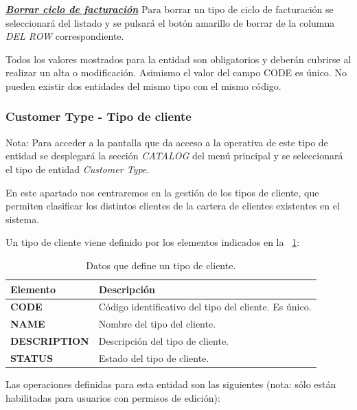 \underline{\textsl{\textbf{Borrar ciclo de facturación}}}\newline
Para borrar un tipo de ciclo de facturación se seleccionará del listado y se pulsará el botón amarillo de borrar de la columna \textit{DEL ROW} correspondiente.\newline

Todos los valores mostrados para la entidad son obligatorios y deberán cubrirse al realizar un alta o modificación. Asimismo el valor del campo CODE es único. No pueden existir dos entidades del mismo tipo con el mismo código.



\subsubsection{Customer Type - Tipo de cliente}
\label{sub:customer-type}

Nota: Para acceder a la pantalla que da acceso a la operativa de este tipo de entidad se desplegará la sección \emph{CATALOG} del menú principal y se seleccionará el tipo de entidad \emph{Customer Type}.

En este apartado nos centraremos en la gestión de los tipos de cliente, que permiten clasificar los distintos clientes de la cartera de clientes existentes en el sistema.


Un tipo de cliente viene definido por los elementos indicados en la \tablename~\ref{tab:tipo-cliente}:



\begin{table}[H]
  \centering
  \setlength{\leftmargini}{0.4cm}
  \resizebox{14cm}{!} {
  \begin{tabular}{|m{3cm} m{11cm}|}
  \rowcolor{udcpink!25}
  \hline
  	\textbf{Elemento} & \textbf{Descripción} \\\hline
	\textbf{CODE} & Código identificativo del tipo del cliente. Es único.   \\
	\textbf{NAME} & Nombre del tipo del cliente. \\
	\textbf{DESCRIPTION} & Descripción del tipo de cliente. \\	
	\textbf{STATUS} & Estado del tipo de cliente.
	\\\hline
  \end{tabular}
  } %
  \caption{Datos que define un tipo de cliente.}
  \label{tab:tipo-cliente}
\end{table}

Las operaciones definidas para esta entidad son las siguientes (nota: sólo están habilitadas para usuarios con permisos de edición):

